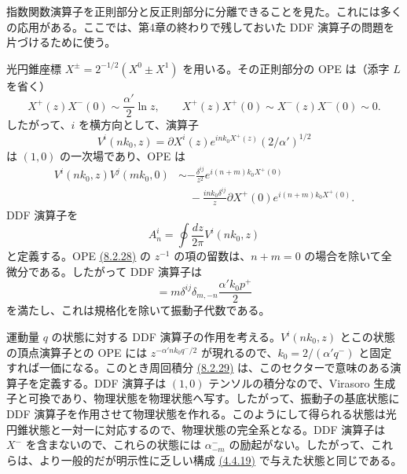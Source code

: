 
指数関数演算子を正則部分と反正則部分に分離できることを見た。これには多くの応用がある。ここでは、第4章の終わりで残しておいた DDF 演算子の問題を片づけるために使う。

光円錐座標 $X^\pm=2^{-1/2}(X^0\pm X^1)$ を用いる。その正則部分の OPE は（添字 $L$ を省く）
\begin{equation}
X^+(z)X^-(0)\sim\frac{\alpha'}2\ln z,\qquad
X^+(z)X^+(0)\sim X^-(z)X^-(0)\sim0.
\tag{8.2.26}\label{eq:8.2.26}
\end{equation}
したがって、$i$ を横方向として、演算子
\begin{equation}
V^i(nk_0,z)=\partial X^i(z)e^{ink_0X^+(z)}(2/\alpha')^{1/2}
\tag{8.2.27}\label{eq:8.2.27}
\end{equation}
は $(1,0)$ の一次場であり、OPE は
\begin{equation}
\begin{aligned}
V^i(nk_0,z)V^j(mk_0,0)&\sim-\frac{\delta^{ij}}{z^2}e^{i(n+m)k_0X^+(0)}\\
&\quad-\frac{ink_0\delta^{ij}}z\partial X^+(0)e^{i(n+m)k_0X^+(0)}.
\end{aligned}
\tag{8.2.28}\label{eq:8.2.28}
\end{equation}
DDF 演算子を
\begin{equation}
A_n^i=\oint\frac{dz}{2\pi}V^i(nk_0,z)
\tag{8.2.29}\label{eq:8.2.29}
\end{equation}
と定義する。OPE \hyperref[eq:8.2.28]{(8.2.28)} の $z^{-1}$ の項の留数は、$n+m=0$ の場合を除いて全微分である。したがって DDF 演算子は
\begin{equation}
[A_m^i,A_n^j]=m\delta^{ij}\delta_{m,-n}\frac{\alpha'k_0p^+}{2}
\tag{8.2.30}\label{eq:8.2.30}
\end{equation}
を満たし、これは規格化を除いて振動子代数である。

運動量 $q$ の状態に対する DDF 演算子の作用を考える。$V^i(nk_0,z)$ とこの状態の頂点演算子との OPE には $z^{-\alpha'nk_0q^-/2}$ が現れるので、$k_0=2/(\alpha'q^-)$ と固定すれば一価になる。このとき周回積分 \hyperref[eq:8.2.29]{(8.2.29)} は、このセクターで意味のある演算子を定義する。DDF 演算子は $(1,0)$ テンソルの積分なので、Virasoro 生成子と可換であり、物理状態を物理状態へ写す。したがって、振動子の基底状態に DDF 演算子を作用させて物理状態を作れる。このようにして得られる状態は光円錐状態と一対一に対応するので、物理状態の完全系となる。DDF 演算子は $X^-$ を含まないので、これらの状態には $\alpha^-_{-m}$ の励起がない。したがって、これらは、より一般的だが明示性に乏しい構成 \hyperref[eq:4.4.19]{(4.4.19)} で与えた状態と同じである。

